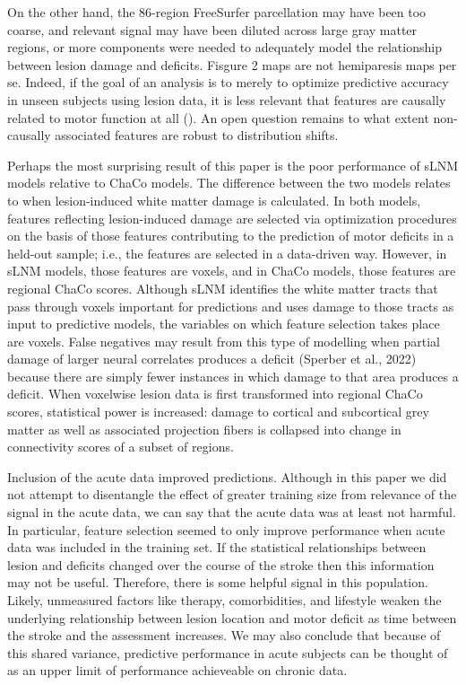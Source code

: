 \documentclass[10pt]{article}
\begin{document}
On the other hand, the 86-region FreeSurfer parcellation may have been too coarse, and relevant signal may have been diluted across large gray matter regions, or more components were needed to adequately model the relationship between lesion damage and deficits. Fisgure 2 maps are not hemiparesis maps per se. Indeed, if the goal of an analysis is to merely to optimize predictive accuracy in unseen subjects using lesion data, it is less relevant that features are causally related to motor function at all (\cite{Price2017-co, Sperber2020-kp}). An open question remains to what extent non-causally associated features are robust to distribution shifts.

Perhaps the most surprising result of this paper is the poor performance of sLNM models relative to ChaCo models. The difference between the two models relates to when lesion-induced white matter damage is calculated. In both models, features reflecting lesion-induced damage are selected via optimization procedures on the basis of those features contributing to the prediction of motor deficits in a held-out sample; i.e., the features are selected in a data-driven way. However, in sLNM models, those features are voxels, and in ChaCo models, those features are regional ChaCo scores. Although sLNM identifies the white matter tracts that pass through voxels important for predictions and uses damage to those tracts as input to predictive models, the variables on which feature selection takes place are voxels. False negatives may result from this type of modelling when partial damage of larger neural correlates produces a deficit (Sperber et al., 2022) because there are simply fewer instances in which damage to that area produces a deficit. When voxelwise lesion data is first transformed into regional ChaCo scores, statistical power is increased: damage to cortical and subcortical grey matter as well as associated projection fibers is collapsed into change in connectivity scores of a subset of regions. 

Inclusion of the acute data improved predictions. Although in this paper we did not attempt to disentangle the effect of greater training size from relevance of the signal in the acute data, we can say that the acute data was at least not harmful. In particular, feature selection seemed to only improve performance when acute data was included in the training set. If the statistical relationships between lesion and deficits changed over the course of the stroke then this information may not be useful. Therefore, there is some helpful signal in this population. Likely, unmeasured factors like therapy, comorbidities, and lifestyle weaken the underlying relationship between lesion location and motor deficit as time between the stroke and the assessment increases. We may also conclude that because of this shared variance, predictive performance in acute subjects can be thought of as an upper limit of performance achieveable on chronic data.
\end{document}
